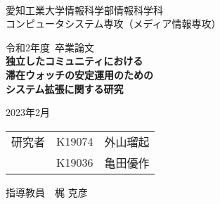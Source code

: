 \begin{titlepage}

  \ \\
  \begin{center}

    {\LARGE 愛知工業大学情報科学部情報科学科\\
      コンピュータシステム専攻（メディア情報専攻）

      \vspace{1.0cm}

      令和2年度~卒業論文\\

      \vspace{2.0cm}
      {\Huge
        \baselineskip=15mm
        \textbf{独立したコミュニティにおける\\滞在ウォッチの安定運用のための\\システム拡張に関する研究\\}}

      \vspace{7.0cm}

      2023年2月\\

      \vspace{1.0cm}

      \begin{tabular}[h]{lll}
        研究者 & K19074 & 外山瑠起 \\
               & K19036 & 亀田優作 \\
      \end{tabular}

      \vspace{1.0cm}

      指導教員\ \
      梶 克彦}

  \end{center}

\end{titlepage}
